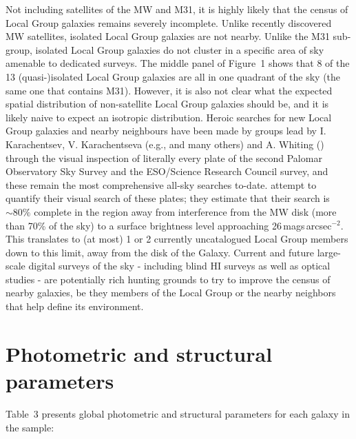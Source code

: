 \documentclass[manuscript]{aastex}
\begin{document}
Not including satellites of the MW and M31, it is highly likely that
the census of Local Group galaxies remains severely incomplete. Unlike
recently discovered MW satellites, isolated Local Group galaxies are
not nearby. Unlike the M31 sub-group, isolated Local Group galaxies do
not cluster in a specific area of sky amenable to dedicated
surveys. The middle panel of Figure~1 shows that 8 of the 13
(quasi-)isolated Local Group galaxies are all in one quadrant of the
sky (the same one that contains M31). However, it is also not clear
what the expected spatial distribution of non-satellite Local Group
galaxies should be, and it is likely naive to expect an isotropic
distribution. Heroic searches for new Local Group galaxies and
nearby neighbours have been made by groups lead by I. Karachentsev,
V.  Karachentseva (e.g., \citealt{karachentseva1998,karachentseva1999,karachentsev2000}
and many others) and A. Whiting (\citealt{whiting1997,whiting1999})
through the visual inspection of
literally every plate of the second Palomar Observatory Sky Survey and
the ESO/Science Research Council survey, and these remain the most
comprehensive all-sky searches to-date. \cite{whiting2007} attempt to
quantify their visual search of these plates; they estimate that their
search is $\sim80\%$ complete in the region away from interference
from the MW disk (more than 70\% of the sky) to a surface brightness
level approaching 26\,mags\,arcsec$^{-2}$. This translates to (at
most) 1 or 2 currently uncatalogued Local Group members down to this
limit, away from the disk of the Galaxy. Current and future
large-scale digital surveys of the sky - including blind HI surveys as
well as optical studies - are potentially rich hunting
grounds to try to improve the census of nearby galaxies, be they
members of the Local Group or the nearby neighbors that help define
its environment.

\section{Photometric and structural parameters}

Table~3 presents global photometric and structural parameters for each galaxy
in the sample:
\end{document}
